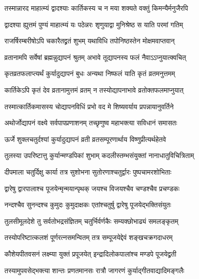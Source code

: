 \twolineshloka
{तस्मान्नारद माहात्म्यं द्वादश्याः कार्तिकस्य च}
{न मया शक्यते वक्तुं किमन्यैर्मनुजैरपि} %

\twolineshloka
{द्वादश्या ह्युत्तमं पुण्यं माहात्म्यं यः पठेन्नरः}
{शृणुयाद्वा मुनिश्रेष्ठ स याति परमां गतिम्} %

\twolineshloka
{राजर्षिरम्बरीषोऽपि चकारैतद्व्रतं शुभम्}
{यथाविधि तपोनिष्ठस्तेन मोक्षमवाप्तवान्} %





\twolineshloka
{व्रतानामपि सर्वेषां ब्रह्मन्नुद्यापनं श्रुतम्}
{अभावे तूद्यापनस्य फलं नैवाऽऽप्नुयात्क्वचित्} %

\twolineshloka
{कृतव्रतफलाप्त्यर्थं कुर्यादुद्यापनं बुधः}
{अन्यथा निष्फलं याति कृतं व्रतमनुत्तमम्} %

\twolineshloka
{कार्तिकेऽपि कृतं देव व्रतानामुत्तमं व्रतम्}
{न तस्योद्यापनाभावे व्रतोक्तफलमाप्नुयात्} %

\twolineshloka
{तस्मात्कार्तिकमासस्य चोद्यापनविधिं प्रभो}
{वद मे शिष्यवर्याय प्रपन्नायानुवर्तिने} %


\twolineshloka
{अथोर्जोद्यापनं वक्ष्ये सर्वपापप्रणाशनम्}
{तच्छृणुष्व महाभक्त्या सविधानं समासतः} %

\twolineshloka
{ऊर्जे शुक्लचतुर्दश्यां कुर्यादुद्यापनं व्रती}
{व्रतसम्पूरणार्थाय विष्णुप्रीत्यर्थहेतवे} %

\twolineshloka
{तुलस्या उपरिष्टात्तु कुर्यान्मण्डपिकां शुभाम्}
{कदलीस्तम्भसंयुक्तां नानाधातुविचित्रिताम्} %

\twolineshloka
{दीपमाला चतुर्दिक्षु कार्या तत्र सुशोभना}
{सुतोरणाश्चतुर्द्वारः पुष्पचामरशोभिताः} %

\twolineshloka
{द्वारेषु द्वारपालाश्च पूजयेन्मृन्मयान्पृथक्}
{जयश्च विजयश्चैव चण्डश्चैव प्रचण्डकः} %

\twolineshloka
{नन्दश्चैव सुनन्दश्च कुमुदः कुमुदाक्षकः}
{एतांश्चतुर्षु द्वारेषु पूजयेद्भक्तिसंयुतः} %

\twolineshloka
{तुलसीमूलदेशे तु सर्वतोभद्रसंज्ञितम्}
{चतुर्भिर्वर्णकैः सम्यक्छोभाढ्यं समलङ्कृतम्} %

\twolineshloka
{तस्योपरिष्टात्कलशं पूर्णरत्नसमन्वितम्}
{तत्र सम्पूजयेद्देवं शङ्खचक्रगदाधरम्} %

\twolineshloka
{कौशेयपीतवसनं लक्ष्म्या युक्तं प्रपूजयेत्}
{इन्द्रादिलोकपालांश्च मण्डपे पूजयेद्व्रती} %

\twolineshloka
{तस्यामुपवसेद्भक्त्या शान्तः प्रणतमानसः}
{रात्रौ जागरणं कुर्याद्गीतवाद्यादिमङ्गलैः} %

